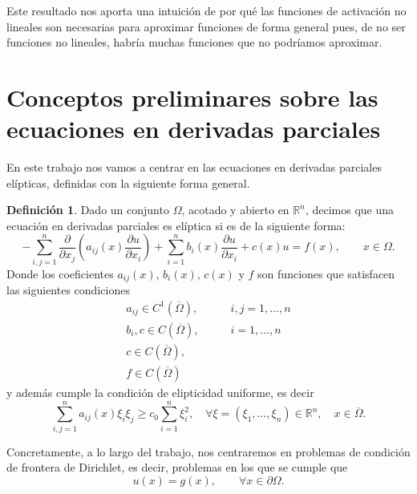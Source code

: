 \documentclass[a4paper,11pt,spanish, twoside, leqno]{tfg-uam}
\theoremstyle{definition}
\newtheorem{defin}[teor]{Definici\'on}
\begin{document}
Este resultado nos aporta una intuición de por qué las funciones de activación no lineales son necesarias para aproximar funciones de forma general pues, de no ser funciones no lineales, habría muchas funciones que no podríamos aproximar. 

\section{Conceptos preliminares sobre las ecuaciones en derivadas parciales} \label{sec:EDPs}

En este trabajo nos vamos a centrar en las ecuaciones en derivadas parciales elípticas, definidas con la siguiente forma general.

\begin{mdframed}
\begin{defin}\label{def:EDP_eliptica}
    Dado un conjunto $\Omega$, acotado y abierto en $\mathbb{R}^n$, decimos que una ecuación en derivadas parciales es elíptica si es de la siguiente forma:
    \begin{equation}\label{eq:EDP_eliptica}
        -\sum_{i,j=1}^{n} \frac{\partial}{\partial x_j}\left( a_{ij}(x)\frac{\partial u}{\partial x_i}\right) + \sum_{i=1}^{n} b_i(x)\frac{\partial u}{\partial x_i} + c(x)u = f(x), \qquad x\in\Omega.
    \end{equation}
    Donde los coeficientes $a_{ij}(x)$, $b_i(x)$, $c(x)$ y $f$ son funciones que satisfacen las siguientes condiciones
    \begin{align}
        a_{ij} \in C^1(\overline{\Omega}),& \qquad i,j = 1, \dots ,n \label{eq:condiciones_EDP_eliptica_a} \\
        b_i, c \in C(\overline{\Omega}),& \qquad i = 1, \dots ,n \\
        c \in C(\overline{\Omega}),& \\
        f\in C(\overline{\Omega})&\label{eq:condiciones_EDP_eliptica_f}
    \end{align}
    y además cumple la condición de elipticidad uniforme, es decir
    \begin{equation}\label{eq:condiciones_EDP_eliptica_elipticidad_uniforme}
        \sum_{i,j=1}^n a_{ij}(x) \xi_i \xi_j \geq c_0 \sum_{i=1}^n \xi_i^2, \quad \forall \xi = (\xi_1, \ldots, \xi_n) \in \mathbb{R}^n, \quad x \in \overline{\Omega}.
    \end{equation}
\end{defin}
\end{mdframed}

Concretamente, a lo largo del trabajo, nos centraremos en problemas de condición de frontera de Dirichlet, es decir, problemas en los que se cumple que
\begin{equation}
    u(x) = g(x), \qquad \forall x\in\partial\Omega.
\end{equation}
\end{document}
